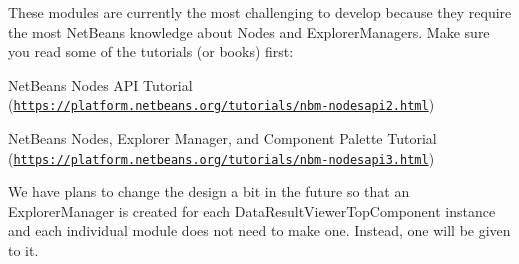 These modules are currently the most challenging to develop because they require the most Net\+Beans knowledge about Nodes and Explorer\+Managers. Make sure you read some of the tutorials (or books) first\+:
\begin{DoxyItemize}
\item Net\+Beans Nodes A\+PI Tutorial (\href{https://platform.netbeans.org/tutorials/nbm-nodesapi2.html}{\tt https\+://platform.\+netbeans.\+org/tutorials/nbm-\/nodesapi2.\+html})
\item Net\+Beans Nodes, Explorer Manager, and Component Palette Tutorial (\href{https://platform.netbeans.org/tutorials/nbm-nodesapi3.html}{\tt https\+://platform.\+netbeans.\+org/tutorials/nbm-\/nodesapi3.\+html})
\end{DoxyItemize}

We have plans to change the design a bit in the future so that an Explorer\+Manager is created for each Data\+Result\+Viewer\+Top\+Component instance and each individual module does not need to make one. Instead, one will be given to it. 